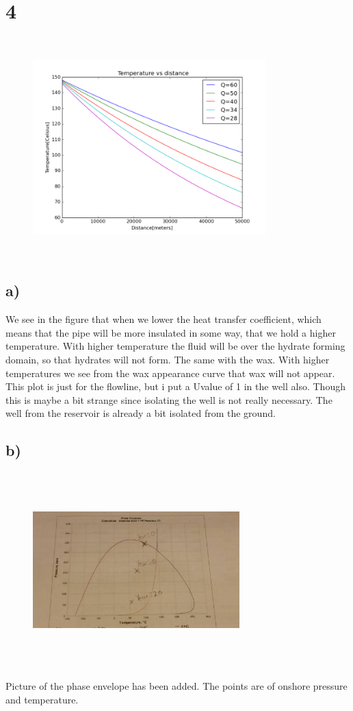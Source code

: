 \documentclass[DIV=calc, paper=a4, fontsize=13pt, twocolumn]{scrartcl}	 %
\begin{document}
\section*{4}
\begin{figure}[h]
\includegraphics[width=9cm,height=8.5cm]{Temp_insulated.png}
\end{figure}
\subsection*{a)}
We see in the figure that when we lower the heat transfer coefficient, which means that the pipe will be more insulated in some way, that we hold a higher temperature. With higher temperature the fluid will be over the hydrate forming domain, so that hydrates will not form. The same with the wax. With higher temperatures we see from the wax appearance curve that wax will not appear.
\newline
This plot is just for the flowline, but i put a Uvalue of 1 in the well also. Though this is maybe a bit strange since isolating the well is not really necessary. The well from the reservoir is already a bit isolated from the ground.
\subsection*{b)}
\begin{figure}[h]
\includegraphics[width=8cm,height=7.5cm]{phase_envelope.jpg}
\end{figure}
Picture of the phase envelope has been added. The points are of onshore pressure and temperature.
\end{document}
